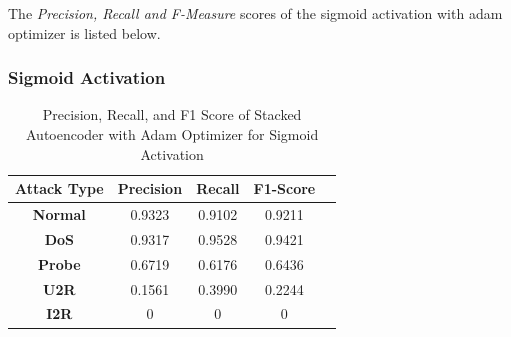 \documentclass[12pt, a4paper]{report}
\begin{document}
The \textit{Precision, Recall and F-Measure} scores of the sigmoid activation with adam optimizer is listed below.\\ \par
\subsubsection{Sigmoid Activation}
\begin{table}[ht]
\centering
\captionsetup{justification=centering,margin=2cm}
\begin{tabular}{|c|c|c|c|c|}
\hline
\multicolumn{1}{|c|}{\textbf{Attack Type}} & \multicolumn{1}{c|}{\textbf{Precision}} & \multicolumn{1}{c|}{\textbf{Recall}} & \multicolumn{1}{c|}{\textbf{F1-Score}} \\ \hline
\textbf{Normal}        & 0.9323                                  & 0.9102                               & 0.9211                                                                  \\ \hline
\textbf{DoS}           & 0.9317                                  & 0.9528                                &  0.9421                                                                   \\ \hline
\textbf{Probe}         & 0.6719                                  & 0.6176                                & 0.6436                                                                  \\ \hline
\textbf{U2R}           & 0.1561                                   & 0.3990                                & 0.2244                                                                     \\ \hline
\textbf{I2R}           & 0                                       & 0                                    & 0                                                                          \\ \hline
\end{tabular}
\caption{Precision, Recall, and F1 Score of Stacked Autoencoder with Adam Optimizer for Sigmoid Activation}
\label{prf1_adam_sigmoid_auto}
\end{table}
\end{document}
